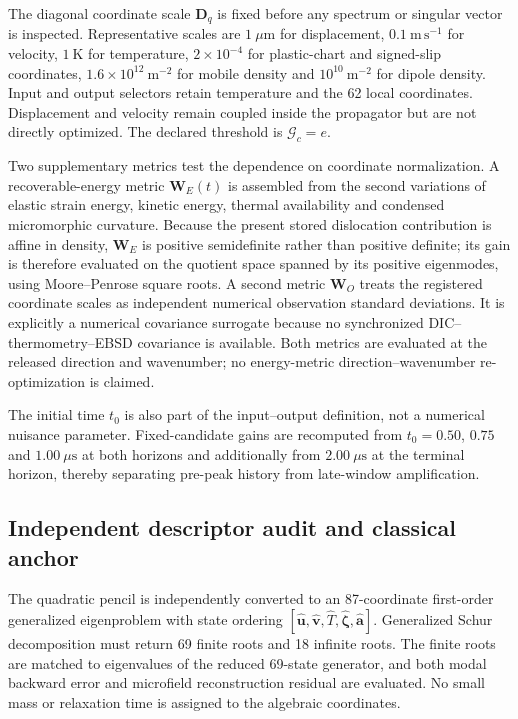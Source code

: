 The diagonal coordinate scale $\boldsymbol D_q$ is fixed before any spectrum or singular vector is inspected. Representative scales are $1~\mu\mathrm m$ for displacement, $0.1~\mathrm{m\,s^{-1}}$ for velocity, $1~\mathrm K$ for temperature, $2\times10^{-4}$ for plastic-chart and signed-slip coordinates, $1.6\times10^{12}~\mathrm{m^{-2}}$ for mobile density and $10^{10}~\mathrm{m^{-2}}$ for dipole density. Input and output selectors retain temperature and the 62 local coordinates. Displacement and velocity remain coupled inside the propagator but are not directly optimized. The declared threshold is $\mathcal G_c=e$.

Two supplementary metrics test the dependence on coordinate normalization. A recoverable-energy metric $\boldsymbol W_E(t)$ is assembled from the second variations of elastic strain energy, kinetic energy, thermal availability and condensed micromorphic curvature. Because the present stored dislocation contribution is affine in density, $\boldsymbol W_E$ is positive semidefinite rather than positive definite; its gain is therefore evaluated on the quotient space spanned by its positive eigenmodes, using Moore--Penrose square roots. A second metric $\boldsymbol W_O$ treats the registered coordinate scales as independent numerical observation standard deviations. It is explicitly a numerical covariance surrogate because no synchronized DIC--thermometry--EBSD covariance is available. Both metrics are evaluated at the released direction and wavenumber; no energy-metric direction--wavenumber re-optimization is claimed.

The initial time $t_0$ is also part of the input--output definition, not a numerical nuisance parameter. Fixed-candidate gains are recomputed from $t_0=0.50$, $0.75$ and $1.00~\mu\mathrm s$ at both horizons and additionally from $2.00~\mu\mathrm s$ at the terminal horizon, thereby separating pre-peak history from late-window amplification.

\subsection{Independent descriptor audit and classical anchor}

The quadratic pencil is independently converted to an 87-coordinate first-order generalized eigenproblem with state ordering $[\widehat{\boldsymbol u},\widehat{\boldsymbol v},\widehat T,\widehat{\boldsymbol\zeta},\widehat{\boldsymbol a}]$. Generalized Schur decomposition must return 69 finite roots and 18 infinite roots. The finite roots are matched to eigenvalues of the reduced 69-state generator, and both modal backward error and microfield reconstruction residual are evaluated. No small mass or relaxation time is assigned to the algebraic coordinates.

